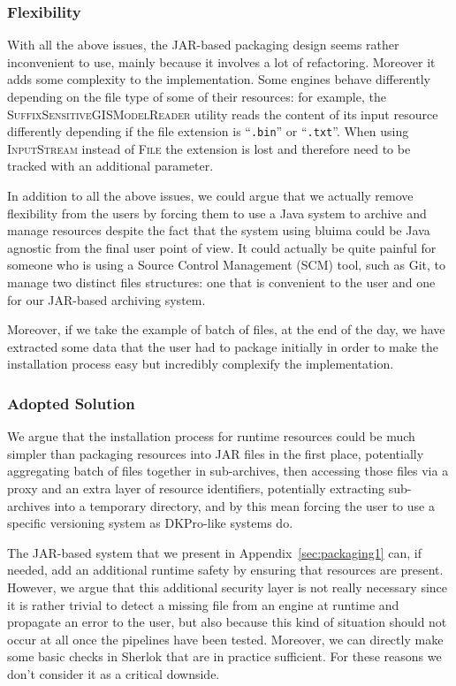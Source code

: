 \documentclass{article}
\newcommand{\ID}[1]{{\textsc{#1}}}
\newcommand{\PATH}[1]{\mbox{\texttt{#1}}}
\newcommand{\JAR}{JAR\xspace}
\begin{document}
\subsubsection{Flexibility}

With all the above issues, the \JAR-based packaging design seems rather inconvenient to use, mainly
because it involves a lot of refactoring. Moreover it adds some complexity to the implementation.
Some engines behave differently depending on the file type of some of their resources: for example,
the \ID{SuffixSensitiveGISModelReader} utility reads the content of its input resource differently
depending if the file extension is ``\PATH{.bin}'' or ``\PATH{.txt}''. When using \ID{InputStream}
instead of \ID{File} the extension is lost and therefore need to be tracked with an additional
parameter.

In addition to all the above issues, we could argue that we actually remove flexibility from the
users by forcing them to use a Java system to archive and manage resources despite the fact that the
system using bluima could be Java agnostic from the final user point of view. It could actually be
quite painful for someone who is using a Source Control Management (SCM) tool, such as Git, to
manage two distinct files structures: one that is convenient to the user and one for our \JAR-based
archiving system.

Moreover, if we take the example of batch of files, at the end of the day, we have extracted some
data that the user had to package initially in order to make the installation process easy but
incredibly complexify the implementation.


\subsubsection{Adopted Solution}

We argue that the installation process for runtime resources could be much simpler than packaging
resources into \JAR files in the first place, potentially aggregating batch of files together in
sub-archives, then accessing those files via a proxy and an extra layer of resource identifiers,
potentially extracting sub-archives into a temporary directory, and by this mean forcing the user to
use a specific versioning system as DKPro-like systems do.

The \JAR-based system that we present in Appendix~\ref{sec:packaging1} can, if needed, add an
additional runtime safety by ensuring that resources are present. However, we argue that this
additional security layer is not really necessary since it is rather trivial to detect a missing
file from an engine at runtime and propagate an error to the user, but also because this kind of
situation should not occur at all once the pipelines have been tested. Moreover, we can directly
make some basic checks in Sherlok that are in practice sufficient. For these reasons we don't
consider it as a critical downside.
\end{document}
